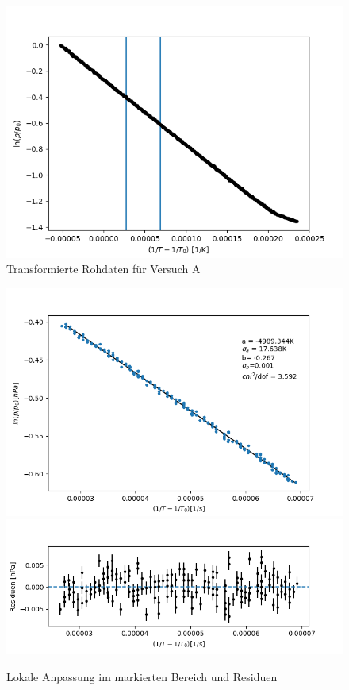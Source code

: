\documentclass[12pt,a4paper]{article}
\begin{document}
\begin{figure}
\includegraphics[width=\linewidth]{Bilder/log_RohdatenA.png}
\caption[Transformierte Daten A]{Transformierte Rohdaten für Versuch A}
\label{fig:logA}
\end{figure}

\begin{figure}
\includegraphics[width=\linewidth]{Bilder/lokaler_fit_2A.png}
\includegraphics[width=\linewidth]{Bilder/lokale_Residuen_2A}
\caption[Lokale Anpassung]{Lokale Anpassung im markierten Bereich und Residuen}
\label{fig:fit_2A}
\end{figure}
\end{document}
